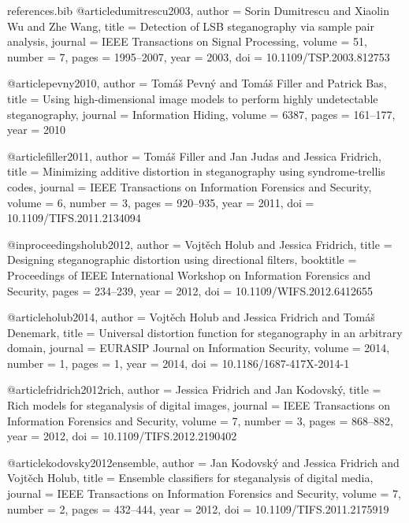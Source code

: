 \begin{filecontents*}{references.bib}
@article{dumitrescu2003,
  author    = {Sorin Dumitrescu and Xiaolin Wu and Zhe Wang},
  title     = {Detection of {LSB} steganography via sample pair analysis},
  journal   = {IEEE Transactions on Signal Processing},
  volume    = {51},
  number    = {7},
  pages     = {1995--2007},
  year      = {2003},
  doi       = {10.1109/TSP.2003.812753}
}

@article{pevny2010,
  author    = {Tom{\'a}{\v{s}} Pevn{\'y} and Tom{\'a}{\v{s}} Filler and Patrick Bas},
  title     = {Using high-dimensional image models to perform highly undetectable steganography},
  journal   = {Information Hiding},
  volume    = {6387},
  pages     = {161--177},
  year      = {2010}
}

@article{filler2011,
  author    = {Tom{\'a}{\v{s}} Filler and Jan Judas and Jessica Fridrich},
  title     = {Minimizing additive distortion in steganography using syndrome-trellis codes},
  journal   = {IEEE Transactions on Information Forensics and Security},
  volume    = {6},
  number    = {3},
  pages     = {920--935},
  year      = {2011},
  doi       = {10.1109/TIFS.2011.2134094}
}

@inproceedings{holub2012,
  author    = {Vojt{\v{e}}ch Holub and Jessica Fridrich},
  title     = {Designing steganographic distortion using directional filters},
  booktitle = {Proceedings of IEEE International Workshop on Information Forensics and Security},
  pages     = {234--239},
  year      = {2012},
  doi       = {10.1109/WIFS.2012.6412655}
}

@article{holub2014,
  author    = {Vojt{\v{e}}ch Holub and Jessica Fridrich and Tom{\'a}{\v{s}} Denemark},
  title     = {Universal distortion function for steganography in an arbitrary domain},
  journal   = {EURASIP Journal on Information Security},
  volume    = {2014},
  number    = {1},
  pages     = {1},
  year      = {2014},
  doi       = {10.1186/1687-417X-2014-1}
}

@article{fridrich2012rich,
  author    = {Jessica Fridrich and Jan Kodovsk{\'y}},
  title     = {Rich models for steganalysis of digital images},
  journal   = {IEEE Transactions on Information Forensics and Security},
  volume    = {7},
  number    = {3},
  pages     = {868--882},
  year      = {2012},
  doi       = {10.1109/TIFS.2012.2190402}
}

@article{kodovsky2012ensemble,
  author    = {Jan Kodovsk{\'y} and Jessica Fridrich and Vojt{\v{e}}ch Holub},
  title     = {Ensemble classifiers for steganalysis of digital media},
  journal   = {IEEE Transactions on Information Forensics and Security},
  volume    = {7},
  number    = {2},
  pages     = {432--444},
  year      = {2012},
  doi       = {10.1109/TIFS.2011.2175919}
}


\end{filecontents*}
